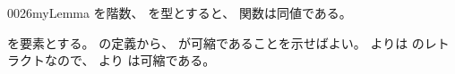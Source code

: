 \documentclass[index]{subfiles}
\begin{document}
\begin{myBlock}{0026}{myLemma}
  を階数、
  を型とすると、
  関数は同値である。
\end{myBlock}
\begin{myProof}
  を要素とする。
  の定義から、
  が可縮であることを示せばよい。
  よりは
  のレトラクトなので、
  より
  は可縮である。
\end{myProof}
\end{document}
